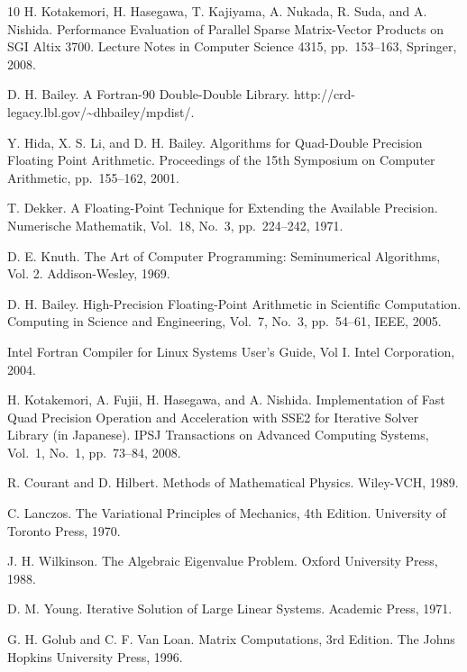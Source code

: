 \documentclass[a4paper]{article}
\begin{document}
\begin{thebibliography}{10}
H. Kotakemori, H. Hasegawa, T. Kajiyama, A. Nukada, R. Suda, and A. Nishida.
\newblock Performance Evaluation of Parallel Sparse Matrix-Vector Products on SGI Altix 3700.
\newblock Lecture Notes in Computer Science 4315, pp.\ 153--163, Springer, 2008.

D. H. Bailey.
\newblock A Fortran-90 Double-Double Library.
\newblock http://crd-legacy.lbl.gov/\textasciitilde dhbailey/mpdist/.

Y. Hida, X. S. Li, and D. H. Bailey.
\newblock Algorithms for Quad-Double Precision Floating Point Arithmetic.
\newblock Proceedings of the 15th Symposium on Computer Arithmetic, pp.\ 155--162, 2001.

T. Dekker.
\newblock A Floating-Point Technique for Extending the Available Precision.
\newblock Numerische Mathematik, Vol.~18, No.~3, pp.\ 224--242, 1971.

D. E. Knuth.
The Art of Computer Programming: Seminumerical Algorithms, Vol. 2.
Addison-Wesley, 1969.

D. H. Bailey.
\newblock High-Precision Floating-Point Arithmetic in Scientific
	Computation.
\newblock Computing in Science and Engineering, Vol.~7, No.~3, pp.\ 54--61, IEEE, 2005.

\newblock Intel Fortran Compiler for Linux Systems User's Guide, Vol I.
\newblock Intel Corporation, 2004.

H. Kotakemori, A. Fujii, H. Hasegawa, and A. Nishida.
\newblock Implementation of Fast Quad Precision Operation and
	Acceleration with SSE2 for Iterative Solver Library (in
	Japanese).
\newblock IPSJ Transactions on Advanced Computing Systems,  Vol.~1, No.~1, pp.\ 73--84, 2008.

R. Courant and D. Hilbert.
\newblock Methods of Mathematical Physics. 
\newblock Wiley-VCH, 1989.

C. Lanczos. 
\newblock The Variational Principles of Mechanics, 4th Edition. 
\newblock University of Toronto Press, 1970.

J. H. Wilkinson. 
\newblock The Algebraic Eigenvalue Problem. 
\newblock Oxford University Press, 1988.

D. M. Young. 
\newblock Iterative Solution of Large Linear Systems. 
\newblock Academic Press, 1971.

G. H. Golub and C. F. Van Loan.
\newblock Matrix Computations, 3rd Edition.
\newblock The Johns Hopkins University Press, 1996.


\end{thebibliography}
\end{document}
